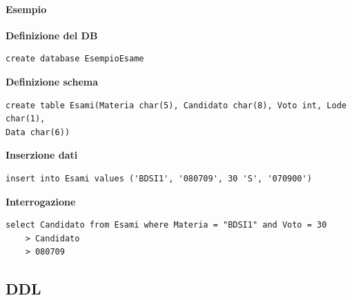 \documentclass[10pt]{book}
\begin{document}
\paragraph{Esempio}
\begin{list}{}{}
	\item \textbf{Definizione del DB}
	\begin{lstlisting}
create database EsempioEsame
	\end{lstlisting}
	\item \textbf{Definizione schema}
	\begin{lstlisting}
create table Esami(Materia char(5), Candidato char(8), Voto int, Lode char(1),
Data char(6))
	\end{lstlisting}
	\item \textbf{Inserzione dati}
	\begin{lstlisting}
insert into Esami values ('BDSI1', '080709', 30 'S', '070900')
	\end{lstlisting}
	\item \textbf{Interrogazione}
	\begin{lstlisting}
select Candidato from Esami where Materia = "BDSI1" and Voto = 30
	> Candidato
	> 080709
	\end{lstlisting}
\end{list}
\pagebreak
\subsection{DDL}
\end{document}

